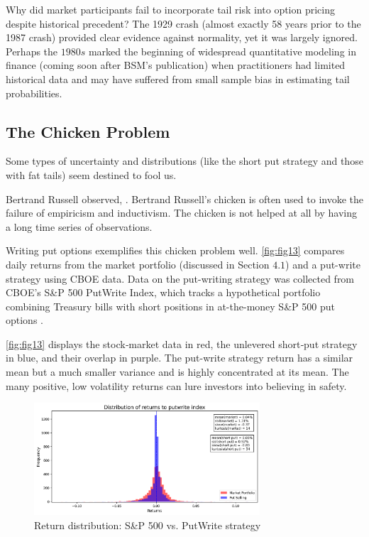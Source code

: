 Why did market participants fail to incorporate tail risk into option pricing despite historical precedent? The 1929 crash (almost exactly 58 years prior to the 1987 crash) provided clear evidence against normality, yet it was largely ignored. Perhaps the $1980s$ marked the beginning of widespread quantitative modeling in finance (coming soon after BSM's publication) when practitioners had limited historical data and may have suffered from small sample bias in estimating tail probabilities.

\subsection{The Chicken Problem}
Some types of uncertainty and distributions (like the short put strategy and those with fat tails) seem destined to fool us. 

Bertrand Russell observed,  \citep{russell1912induction}. Bertrand Russell’s chicken is often used to invoke the failure of empiricism and inductivism. The chicken is not helped at all by having a long time series of observations. 

Writing put options exemplifies this chicken problem well. \autoref{fig:fig13} compares daily returns from the market portfolio (discussed in Section $4.1$) and a put-write strategy using CBOE data. Data on the put-writing strategy was collected from CBOE's S\&P 500 PutWrite Index, which tracks a hypothetical portfolio combining Treasury bills with short positions in at-the-money S\&P 500 put options \citep{Cboe}.

\autoref{fig:fig13} displays the stock‑market data in red, the unlevered short‑put strategy in blue, and their overlap in purple. The put-write strategy return has a similar mean but a much smaller variance and is highly concentrated at its mean. The many positive, low volatility returns can lure investors into believing in safety. 

\begin{figure}[h]
    \centering
    \includegraphics[width=0.75\textwidth]{fig13.png}
    \caption{Return distribution: S\&P 500 vs. PutWrite strategy}
    \label{fig:fig13}
\end{figure}

